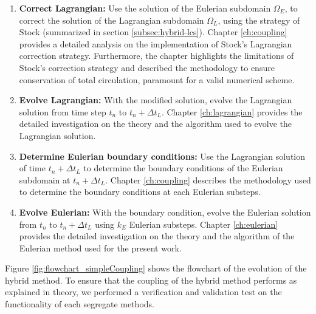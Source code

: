 		\begin{enumerate}
		\item \textbf{Correct Lagrangian:} Use the solution of the Eulerian subdomain $\Omega_E$, to correct the solution of the Lagrangian subdomain $\Omega_L$, using the strategy of Stock (summarized in section 	\ref{subsec:hybrid-lcs}). Chapter \ref{ch:coupling} provides a detailed analysis on the implementation of Stock's Lagrangian correction strategy. Furthermore, the chapter highlights the limitations of Stock's correction strategy and described the methodology to ensure conservation of total circulation, paramount for a valid numerical scheme.
		
		\item \textbf{Evolve Lagrangian:} With the modified solution, evolve the Lagrangian solution from time step $t_n$ to $t_{n}+\Delta t_L$. Chapter \ref{ch:lagrangian} provides the detailed investigation on the theory and the algorithm used to evolve the Lagrangian solution.
		
		\item \textbf{Determine Eulerian boundary conditions:} Use the Lagrangian solution of time $t_{n}+\Delta t_L$ to determine the boundary conditions of the Eulerian subdomain at $t_{n}+\Delta t_L$. Chapter \ref{ch:coupling} describes the methodology used to determine the boundary conditions at each Eulerian substeps.
		
		\item \textbf{Evolve Eulerian:} With the boundary condition, evolve the Eulerian solution from $t_n$ to $t_{n}+\Delta t_L$ using $k_E$ Eulerian substeps. Chapter \ref{ch:eulerian} provides the detailed investigation on the theory and the algorithm of the Eulerian method used for the present work.
		\end{enumerate}
	
	Figure \ref{fig:flowchart_simpleCoupling} shows the flowchart of the evolution of the hybrid method. To ensure that the coupling of the hybrid method performs as explained in theory, we performed a verification and validation test on the functionality of each segregate methods.
	

